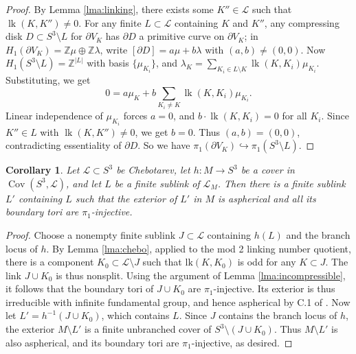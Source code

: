 \documentclass{amsart}
\theoremstyle{plain}
\theoremstyle{definition}
\theoremstyle{plain}
\theoremstyle{plain}
\newtheorem{corollary}[theorem]{Corollary}
\theoremstyle{plain}
\theoremstyle{remark}
\theoremstyle{remark}
\theoremstyle{plain}
\theoremstyle{definition}
\theoremstyle{plain}
\DeclareMathOperator{\Cov}{\mathrm{Cov}}
\DeclareMathOperator{\lk}{\mathrm{lk}}
\theoremstyle{plain}
\theoremstyle{plain}
\numberwithin{equation}{section}
\begin{document}
\begin{proof}
By Lemma \ref{lma:linking}, there exists some $K'' \in \mathcal{L}$ such that $\lk(K, K'') \neq 0$. For any finite $L \subset \mathcal{L}$ containing $K$ and $K''$, any compressing disk $D \subset S^3 \setminus L$ for $\partial V_K$ has $\partial D$ a primitive curve on $\partial V_K$; in $H_1(\partial V_K) = \mathbb{Z}\mu \oplus \mathbb{Z}\lambda$, write $[\partial D] = a\mu + b\lambda$ with $(a, b) \neq (0, 0)$. Now $H_1(S^3 \setminus L)  = \mathbb{Z}^{|L|}$ with basis $\{\mu_{K_i}\}$, and $\lambda_K = \sum_{K_i \in L \setminus K}\lk(K, K_i)\mu_{K_i}$. Substituting, we get
\begin{equation}
    0 = a\mu_K + b\sum_{K_i \neq K}\lk(K, K_i)\mu_{K_i}.
\end{equation}
Linear independence of $\mu_{K_i}$ forces $a = 0$, and $b \cdot \lk(K, K_i) = 0$ for all $K_i$. Since $K'' \in L$ with $\lk(K, K'') \neq 0$, we get $b = 0$. Thus $(a, b) = (0, 0)$, contradicting essentiality of $\partial D$. So we have $\pi_1(\partial V_K) \hookrightarrow \pi_1(S^3 \setminus L)$.
\end{proof}

\begin{corollary}\label{cor:incompressible2}
Let $\mathcal{L} \subset S^3$ be Chebotarev, let $h: M \to S^3$ be a cover in $\Cov(S^3, \mathcal L)$, and let $L$ be a finite sublink of $\mathcal L_M$. Then there is a finite sublink $L'$ containing $L$ such that the exterior of $L'$ in $M$ is aspherical and all its boundary tori are $\pi_1$-injective.
\end{corollary}

\begin{proof}
Choose a nonempty finite sublink $J \subset \mathcal L$ containing $h(L)$ and the branch locus of $h$. By Lemma \ref{lma:chebo}, applied to the mod 2 linking number quotient, there is a component $K_0 \subset \mathcal L \setminus J$ such that $\mathrm{lk}(K, K_0)$ is odd for any $K \subset J$. The link $J \cup K_0$ is thus nonsplit. Using the argument of Lemma \ref{lma:incompressible}, it follows that the boundary tori of $J \cup K_0$ are $\pi_1$-injective. Its exterior is thus irreducible with infinite fundamental group, and hence aspherical by C.1 of \cite{3groups}. Now let $L' = h^{-1}(J \cup K_0)$, which contains $L$. Since $J$ contains the branch locus of $h$, the exterior $M \setminus L'$ is a finite unbranched cover of $S^3 \setminus (J \cup K_0)$. Thus $M \setminus L'$ is also aspherical, and its boundary tori are $\pi_1$-injective, as desired. 
\end{proof}
\end{document}
